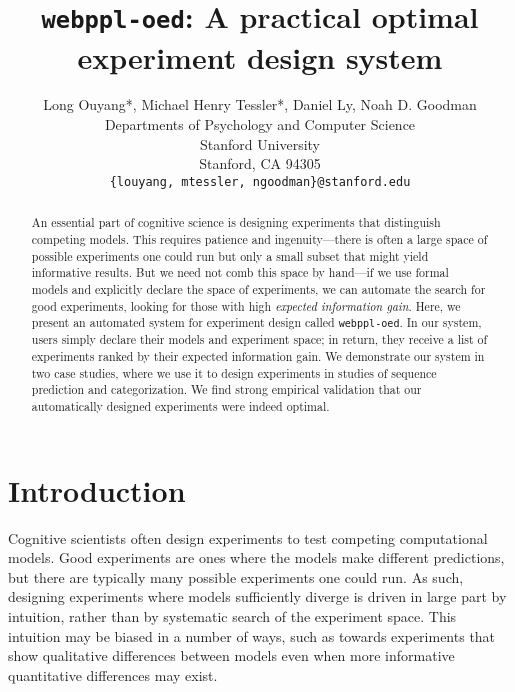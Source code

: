\documentclass[10pt,letterpaper]{article}
\title{\texttt{webppl-oed}: A practical optimal experiment design system}
\author{
  Long Ouyang*, Michael Henry Tessler*, Daniel Ly, Noah D. Goodman\\
  Departments of Psychology and  Computer Science\\
  Stanford University\\
  Stanford, CA 94305 \\
  \texttt{\{louyang, mtessler, ngoodman\}@stanford.edu}\\
}
\newcommand{\ndg}[1]{\textcolor{Green}{[ndg: #1]}}
\newcommand{\mht}[1]{\textcolor{Blue}{[mht: #1]}}
\newcommand{\lou}[1]{\textcolor{orange}{[lou: #1]}}
\begin{document}

\maketitle

\begin{abstract}

An essential part of cognitive science is designing experiments that distinguish competing models.
This requires patience and ingenuity---there is often a large space of possible experiments one could run but only a small subset that might yield informative results.
But we need not comb this space by hand---if we use formal models and explicitly declare the space of experiments, we can automate the search for good experiments, looking for those with high \emph{expected information gain}.
Here, we present an automated system for experiment design called \texttt{webppl-oed}.
In our system, users simply declare their models and experiment space; in return, they receive a list of experiments ranked by their expected information gain.
We demonstrate our system in two case studies, where we use it to design experiments in studies of sequence prediction and categorization.
We find strong empirical validation that our automatically designed experiments were indeed optimal.


\end{abstract}


\section{Introduction}
Cognitive scientists often design experiments to test competing computational models.
Good experiments are ones where the models make different predictions, but there are typically many possible experiments one could run.
As such, designing experiments where models sufficiently diverge is driven in large part by intuition, rather than by systematic search of the experiment space.
This intuition may be biased in a number of ways, such as towards experiments that show qualitative differences between models even when more informative quantitative differences may exist.
\end{document}
